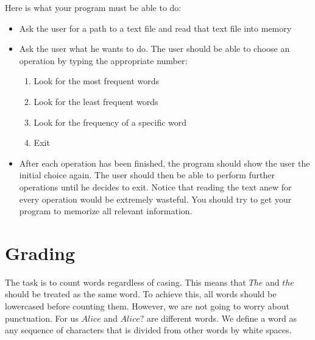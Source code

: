 \documentclass[11pt, leqno, a4paper]{article}
\begin{document}
Here is what your program must be able to do:
\begin{itemize}
\item Ask the user for a path to a text file and read that text file into memory
\item Ask the user what he wants to do. The user should be able to choose an operation by typing the appropriate number:
\begin{enumerate}
\item Look for the most frequent words
\item Look for the least frequent words
\item Look for the frequency of a specific word
\item Exit
\end{enumerate}
\item After each operation has been finished, the program should show the user the initial choice again. The user should then 
be able to perform further operations until 
he decides to exit. Notice that reading the text anew for every operation would be extremely wasteful. You should try to get your program to memorize all
relevant information.
\end{itemize}

\section{Grading}
The task is to count words regardless of casing. This means that $ The $ and $ the $ should be treated as the same word. To achieve this, all words should be lowercased before counting them. However, we are not going to worry about punctuation. For us $ Alice $ and $ Alice? $ are different words. We define a word as any sequence
of characters that is divided from other words by white spaces.
\end{document}
